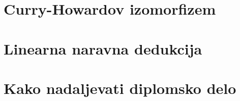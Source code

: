 \documentclass[12pt, titlepage, a4paper]{article}
\newcommand{\cd}[1]{\texttt{#1}}
\begin{document}
\section{Curry-Howardov izomorfizem\label{curr-how}} 



\section{Linearna naravna dedukcija\label{lin}}






\section{Kako nadaljevati diplomsko delo}
\end{document}

